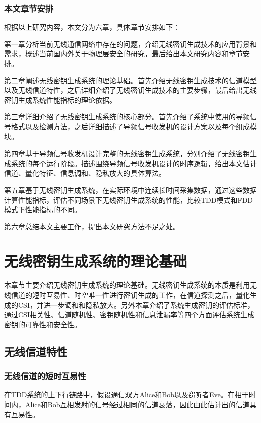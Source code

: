 \documentclass[master]{seuthesis} %
\begin{document}
\begin{Main}
\subsection{本文章节安排}

根据以上研究内容，本文分为六章，具体章节安排如下：

第一章分析当前无线通信网络中存在的问题，介绍无线密钥生成技术的应用背景和需求，概述当前国内外关于物理层安全的研究，最后给出本文研究内容和章节安排。

第二章阐述无线密钥生成系统的理论基础。首先介绍无线密钥生成技术的信道模型以及无线信道特性，之后详细介绍了无线密钥生成技术的主要步骤，最后给出无线密钥生成系统性能指标的理论依据。

第三章详细介绍了无线密钥生成系统的核心部分。首先介绍了系统中使用的导频信号格式以及检测方法，之后详细描述了导频信号收发机的设计方案以及每个组成模块。

第四章基于导频信号收发机设计完整的无线密钥生成系统，分别介绍了无线密钥生成系统的每个运行阶段。描述围绕导频信号收发机设计的时序逻辑，给出本文估计信道、量化特征、信息调和、隐私放大的具体算法。

第五章基于无线密钥生成系统，在实际环境中连续长时间采集数据，通过这些数据计算性能指标，评估不同场景下无线密钥生成系统的性能，比较TDD模式和FDD模式下性能指标的不同。

第六章总结本文主要工作，提出本文研究方法不足之处。

\chapter{无线密钥生成系统的理论基础}

本章节主要介绍无线密钥生成系统的理论基础。无线密钥生成系统的本质是利用无线信道的短时互易性、时空唯一性进行密钥生成的工作，在信道探测之后，量化生成的CSI，并进一步调和和隐私放大。另外本章介绍了系统生成密钥的评估标准，通过CSI相关性、信道随机性、密钥随机性和信息泄漏率等四个方面评估系统生成密钥的可靠性和安全性。

\section{无线信道特性}

\subsection{无线信道的短时互易性}

在TDD系统的上下行链路中，假设通信双方Alice和Bob以及窃听者Eve。在相干时间内，Alice和Bob互相发射的信号经过相同的信道衰落，因此由此估计出的信道具有互易性\cite{ye2010information}\cite{azimi2007robust}。


\end{Main}
\end{document}
